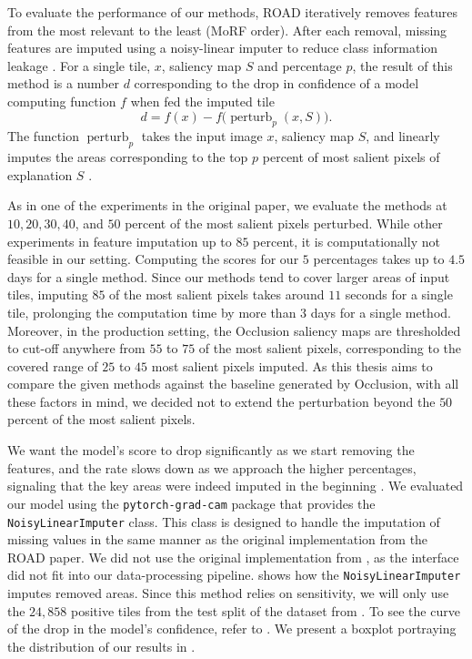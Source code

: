 To evaluate the performance of our methods, ROAD iteratively removes features from the most relevant to the least (MoRF order).
After each removal, missing features are imputed using a noisy-linear imputer to reduce class information leakage \cite{road}.
For a single tile, $x$, saliency map $S$ and percentage $p$, the result of this method is a number $d$ corresponding to the drop in confidence of a model computing function $f$ when fed the imputed tile
\begin{equation}
    d = f(x) - f\bigl(\operatorname{perturb}_p(x, S)\bigr).
\end{equation}
The function $\operatorname{perturb}_p$ takes the input image $x$, saliency map $S$, and linearly imputes the areas corresponding to the top $p$ percent of most salient pixels of explanation $S$ \cite{road}.

As in one of the experiments in the original paper, we evaluate the methods at $10, 20, 30, 40$, and $50$ percent of the most salient pixels perturbed.
While other experiments in \cite{road} feature imputation up to $85$ percent, it is computationally not feasible in our setting.
Computing the scores for our $5$ percentages takes up to $4.5$ days for a single method.
Since our methods tend to cover larger areas of input tiles, imputing $85$ of the most salient pixels takes around $11$ seconds for a single tile, prolonging the computation time by more than $3$ days for a single method.
Moreover, in the production setting, the Occlusion saliency maps are thresholded to cut-off anywhere from $55$ to $75$ of the most salient pixels, corresponding to the covered range of $25$ to $45$ most salient pixels imputed.
As this thesis aims to compare the given methods against the baseline generated by Occlusion, with all these factors in mind, we decided not to extend the perturbation beyond the $50$ percent of the most salient pixels.

We want the model's score to drop significantly as we start removing the features, and the rate slows down as we approach the higher percentages, signaling that the key areas were indeed imputed in the beginning \cite{road}.
We evaluated our model using the \texttt{pytorch-grad-cam} package that provides the \texttt{NoisyLinearImputer} class.
This class is designed to handle the imputation of missing values in the same manner as the original implementation from the ROAD paper.
We did not use the original implementation from \cite{road}, as the interface did not fit into our data-processing pipeline.
 shows how the \texttt{NoisyLinearImputer} imputes removed areas.
Since this method relies on sensitivity, we will only use the $24,858$ positive tiles from the test split of the dataset from .
To see the curve of the drop in the model's confidence, refer to .
We present a boxplot portraying the distribution of our results in .

